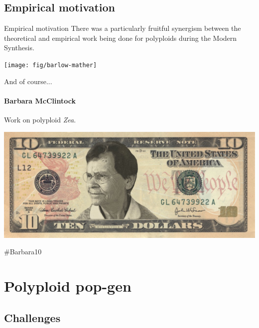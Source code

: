\documentclass[presentation]{beamer}
\begin{document}
\subsection{Empirical motivation}

\begin{frame}[t]{Empirical motivation}
	There was a particularly fruitful synergism between the theoretical and empirical work being done for polyploids during the Modern Synthesis.
	\vspace{0.1in}
	
	\begin{center}
		\texttt{[image: fig/barlow-mather]}
	\end{center}
\end{frame}

\begin{frame}[c]{And of course...}
\framesubtitle{Barbara McClintock}

Work on polyploid \textit{Zea}.

	\begin{center}
		\includegraphics[width=\textwidth]{fig/barbara10}
	\end{center}
	
	\hfill {\scriptsize \#Barbara10}

\end{frame}

\section{Polyploid pop-gen}

\subsection{Challenges}
\end{document}
